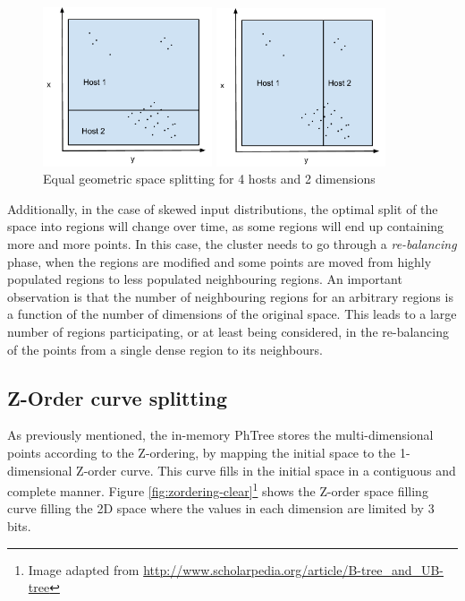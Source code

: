 \documentclass[11pt,a4paper]{globis-book}
\begin{document}
\begin{figure}
\centering
\parbox{5cm}{
    \includegraphics[width=5cm]{images/geometric-bad-split}
    \caption{}
    \label{fig:geometric-bad-split}}
\qquad
\begin{minipage}{5cm}
    \includegraphics[width=5cm]{images/geometric-bad-split-2}
    \caption{Equal geometric space splitting for 4 hosts and 2 dimensions}
    \label{fig:geometric-bad-split-2}
\end{minipage}
\end{figure}

Additionally, in the case of skewed input distributions, the optimal split of the space into regions will change over time, as some regions will end up containing more and more points. In this case, the cluster needs to go through a \textit{re-balancing} phase, when the regions are modified and some points are moved from highly populated regions to less populated neighbouring regions. An important observation is that the number of neighbouring regions for an arbitrary regions is a function of the number of dimensions of the original space. This leads to a large number of regions participating, or at least being considered, in the re-balancing of the points from a single dense region to its neighbours. 

\subsection{Z-Order curve splitting}

As previously mentioned, the in-memory PhTree stores the multi-dimensional points according to the Z-ordering, by mapping the initial space to the 1-dimensional Z-order curve. This curve fills in the initial space in a contiguous and complete manner. Figure \ref{fig:zordering-clear}\footnote{Image adapted from \url{http://www.scholarpedia.org/article/B-tree_and_UB-tree}} shows the Z-order space filling curve filling the 2D space where the values in each dimension are limited by 3 bits.  
\end{document}
